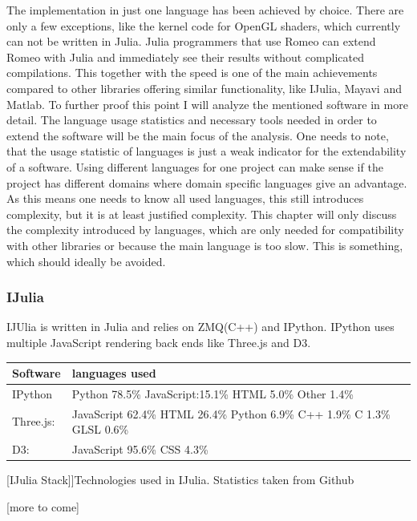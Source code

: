 The implementation in just one language has been achieved by choice. There are only a few exceptions, like the kernel code for OpenGL shaders, which currently can not be written in Julia. 
Julia programmers that use Romeo can extend Romeo with Julia and immediately see their results without complicated compilations.
This together with the speed is one of the main achievements compared to other libraries offering similar functionality, like IJulia, Mayavi and Matlab.
To further proof this point I will analyze the mentioned software in more detail.
The language usage statistics and necessary tools needed in order to extend the software will be the main focus of the analysis.
One needs to note, that the usage statistic of languages is just a weak indicator for the extendability of a software.
Using different languages for one project can make sense if the project has different domains where domain specific languages give an advantage. As this means one needs to know all used languages, this still introduces complexity, but it is at least justified complexity.
This chapter will only discuss the complexity introduced by languages, which are only needed for compatibility with other libraries or because the main language is too slow. This is something, which should ideally be avoided.


\subsubsection{IJulia}

IJUlia is written in Julia and relies on ZMQ(C++) and IPython. 
IPython uses multiple JavaScript rendering back ends like Three.js and D3.
\begin{table}[htbp]
    \centering
    \begin{tabular}{l|l}
        \hline
        \textbf{Software} & \textbf{languages used}\\
        \hline
        IPython     & Python 78.5\% JavaScript:15.1\% HTML 5.0\% Other 1.4\%\\
        Three.js:   & JavaScript 62.4\% HTML 26.4\% Python 6.9\% C++ 1.9\% C 1.3\% GLSL 0.6\%\\
        D3:         & JavaScript 95.6\% CSS 4.3\%\\
        \hline
        \end{tabular}
    [IJulia Stack]]{Technologies used in IJulia. Statistics taken from Github}
    \label{table:ijuliastack}
\end{table}
[more to come]

